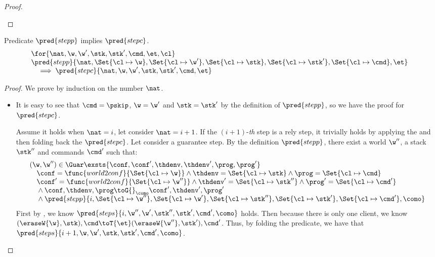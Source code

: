 \begin{proof}
\begin{itemize}
\begin{itemize}
\begin{itemize}
    \end{itemize}
\end{itemize}
\end{itemize}
\end{proof}


\begin{lemma}
\label{lem:prgram-step-to-command-step}
Predicate \( \pred{stepp} \) implies  \( \pred{stepc} \).
\[
\begin{array}{@{}l}
    \for{\nat, \w, \w', \stk, \stk', \cmd, \et, \cl} \\
    \pred{stepp}{\nat, \Set{\cl \mapsto \w},\Set{\cl \mapsto \w'}, \Set{\cl \mapsto \stk}, \Set{ \cl \mapsto \stk'}, \Set{\cl \mapsto \cmd}, \et}  \\ 
    \quad \implies \pred{stepc}{\nat, \w, \w', \stk, \stk', \cmd, \et} \\
\end{array}
\]
\end{lemma}
\begin{proof}
We prove by induction on the number \( \nat \).

\begin{itemize}

\item {}
It is easy to see that \( \cmd = \pskip \), \( \w = \w'\) and \( \stk = \stk' \) by the definition of \(  \pred{stepp}\), so we have the proof for \( \pred{stepc} \).

Assume it holds when \( \nat = i \), let consider \( \nat = i + 1 \).
If the \((i + 1)\)-\emph{th} step is a rely step, it trivially holds by applying the \ih and then folding back the \( \pred{stepc} \).
Let consider a guarantee step.
By the definition \( \pred{stepp}\), there exist a world \( \w'' \), a stack \( \stk'' \) and commands \( \cmd' \) such that:
\[
\begin{array}{@{}l@{}}
    (\w, \w'') \in \Guar  
    \exsts{\conf, \conf', \thdenv, \thdenv', \prog, \prog'} \\
    \quad \conf = \func{world2conf}{\Set{\cl \mapsto \w}}
    \land \thdenv =  \Set{\cl \mapsto \stk} 
    \land \prog = \Set{\cl \mapsto \cmd} \\
    \quad {} \conf' = \func{world2conf}{\Set{\cl \mapsto \w''}}
    \land \thdenv' =  \Set{\cl \mapsto \stk''} 
    \land \prog' = \Set{\cl \mapsto \cmd'} \\
    \quad {} \land  \conf, \thdenv , \prog \toG{}_{\como} \conf', \thdenv' , \prog'   \\
    \quad {} \land \pred{stepp}{ i, \Set{\cl \mapsto \w''},\Set{\cl \mapsto \w'}, \Set{\cl \mapsto \stk''}, \Set{ \cl \mapsto \stk'}, \Set{\cl \mapsto \cmd'}, \como}
\end{array}
\]
First by \ih, we know  \( \pred{steps}{ i, \w'', \w', \stk'', \stk', \cmd', \como} \) holds.
Then because there is only one client, we know \( (\eraseW{\w}, \stk ), \cmd \toT{\et} (\eraseW{\w''}, \stk'), \cmd' \).
Thus, by folding the predicate, we have that \( \pred{steps}{ i + 1, \w, \w', \stk, \stk', \cmd', \como} \).
\end{itemize}
\end{proof}
